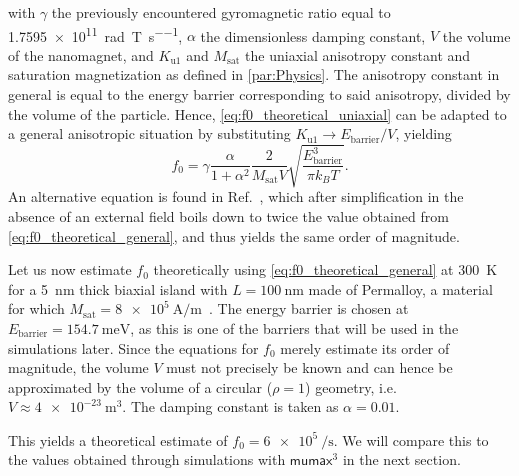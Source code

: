 \documentclass[11pt,a4paper,english]{article}
\newcommand{\mumax}{$\mathsf{mumax}^3$}
\begin{document}
with $\gamma$ the previously encountered gyromagnetic ratio equal to \SI{1.7595e11}{\radian\per\tesla\per\second}, $\alpha$ the dimensionless damping constant, $V$ the volume of the nanomagnet, and $K_\mathrm{u1}$ and $M_\mathrm{sat}$ the uniaxial anisotropy constant and saturation magnetization as defined in \cref{par:Physics}. The anisotropy constant in general is equal to the energy barrier corresponding to said anisotropy, divided by the volume of the particle. Hence, \cref{eq:f0_theoretical_uniaxial} can be adapted to a general anisotropic situation by substituting $K_\mathrm{u1} \rightarrow E_\mathrm{barrier}/V$, yielding
\begin{equation}
    f_0 = \gamma \frac{\alpha}{1+\alpha^2} \frac{2}{M_\mathrm{sat} V} \sqrt{\frac{E_\mathrm{barrier}^3}{\pi k_B T}} \mathrm{.}
    \label{eq:f0_theoretical_general}
\end{equation}
An alternative equation is found in Ref.~\cite{f0_alternative_Jonathan}, which after simplification in the absence of an external field boils down to twice the value obtained from \cref{eq:f0_theoretical_general}, and thus yields the same order of magnitude. \par
Let us now estimate $f_0$ theoretically using \cref{eq:f0_theoretical_general} at \SI{300}{\kelvin} for a \SI{5}{\nano\metre} thick biaxial island with $L=\SI{100}{\nano\metre}$ made of Permalloy, a material for which $M_\mathrm{sat}=\SI{8e5}{\ampere\per\metre}$~\cite{MuMax3}. The energy barrier is chosen at $E_\mathrm{barrier}=\SI{154.7}{\milli\electronvolt}$, as this is one of the barriers that will be used in the simulations later. Since the equations for $f_0$ merely estimate its order of magnitude, the volume $V$ must not precisely be known and can hence be approximated by the volume of a circular ($\rho=1$) geometry, i.e. $V\approx\SI{4e-23}{\metre\cubed}$. The damping constant is taken as $\alpha=0.01$. \par
This yields a theoretical estimate of $f_0 = \SI{6e5}{\per\second}$. We will compare this to the values obtained through simulations with \mumax{} in the next section.
\end{document}
